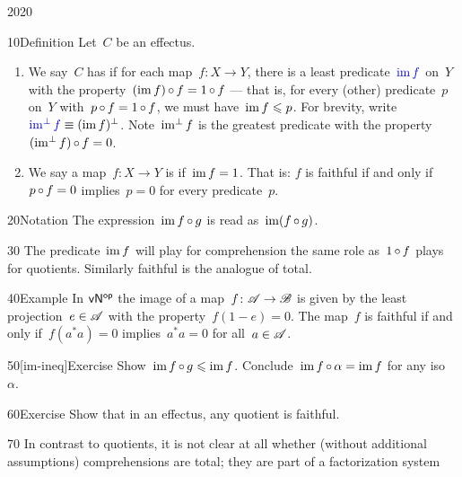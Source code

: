 \begin{parsec}{2020}%
\begin{point}{10}{Definition}%
Let~$C$ be an effectus.
\begin{enumerate}
\item
    We say~$C$ has 
    if for each map~$f\colon X \to Y$,
    there is a least predicate~$\Define{\IM f}$ on~$Y$
        with the property~$(\operatorname{im} f) \mathop{\circ} f = 1 \mathop{\circ} f$ ---
        that is, 
    for every (other) predicate~$p$ on~$Y$
    with~$p \mathop{\circ} f = 1 \mathop{\circ} f$,
    we must have~$\operatorname{im} f \leqslant p$.
For brevity, write~$\Define{\IMperp f} \equiv (\IM f)^\perp$. 
Note~$\operatorname{im^\perp} f$ is the greatest predicate
with the property~$(\operatorname{im^\perp} f) \mathop{\circ} f = 0$.
\item
We say a map~$f\colon X \to Y$ is 
    if~$\operatorname{im} f = 1$.
That is: $f$ is faithful if and only if
    $p \mathop{\circ} f = 0$ implies~$p = 0$
    for every predicate~$p$.
\end{enumerate}
\begin{point}{20}{Notation}%
The expression~$\operatorname{im} f \mathop{\circ} g$
    is read as~$\operatorname{im} (f \mathop{\circ} g)$.
\end{point}
\begin{point}{30}%
The predicate~$\operatorname{im} f$ will play for comprehension the same role
    as~$1 \mathop{\circ} f$ plays for quotients.
Similarly faithful is the analogue of total.
\end{point}
\end{point}
\begin{point}{40}{Example}%
In ${\mathsf{vN}}{^{\mathsf{op}}}$ the image of a map~$f\colon \mathscr{A} \to \mathscr{B}$
    is given by the least projection~$e \in \mathscr{A}$
    with the property~$f(1-e) = 0$.
The map~$f$ is faithful if and only
    if~$f(a^*a)=0$ implies~$a^*a = 0$
    for all~$a\in \mathscr{A}$.
\end{point}
\begin{point}{50}[im-ineq]{Exercise}%
Show~$\operatorname{im} f \mathop{\circ} g \leqslant \operatorname{im} f$.
Conclude~$\operatorname{im} f \mathop{\circ} \alpha = \operatorname{im} f$
    for any iso~$\alpha$.
\end{point}
\begin{point}{60}{Exercise}%
Show that in an effectus, any quotient is faithful.
\end{point}
\begin{point}{70}%
In contrast to quotients,
    it is not clear at all whether (without additional assumptions)
    comprehensions are total;
    they are part of a factorization system

\end{point}
\end{parsec}

